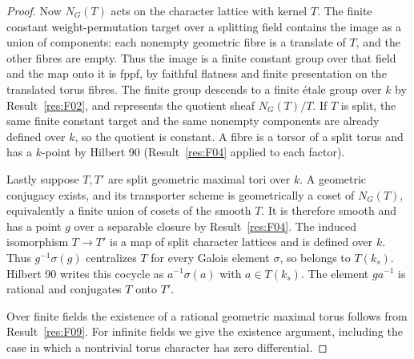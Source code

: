 \documentclass[11pt,a4paper,openany,oneside]{book}
\theoremstyle{resultstyle}
\theoremstyle{definition}
\numberwithin{equation}{chapter}
\begin{document}
\begin{proof}
Now \(N_G(T)\) acts on the character lattice with kernel \(T\).
The finite constant weight-permutation target over a
splitting field contains the image as a union of components:
each nonempty geometric fibre is a translate of \(T\),
and the other fibres are empty. Thus the image is a
finite constant group over that field and the map onto it
is fppf, by faithful flatness and finite presentation on the
translated torus fibres. The finite group descends to a finite
\'etale group over \(k\) by Result~\ref{res:F02}, and represents
the quotient sheaf \(N_G(T)/T\). If \(T\) is split, the same
finite constant target and the same nonempty components
are already defined over \(k\), so the quotient is constant.
A fibre is a torsor of a split torus and has a \(k\)-point by
Hilbert 90 (Result~\ref{res:F04} applied to each factor).

Lastly suppose \(T,T'\) are split geometric maximal tori
over \(k\). A geometric conjugacy exists, and its
transporter scheme is geometrically a coset of \(N_G(T)\),
equivalently a finite union of cosets of the smooth \(T\).
It is therefore smooth and has a point \(g\) over a separable
closure by Result~\ref{res:F04}. The induced isomorphism
\(T\to T'\) is a map of split character lattices and is defined
over \(k\). Thus \(g^{-1}\sigma(g)\) centralizes \(T\)
for every Galois element \(\sigma\), so belongs to \(T(k_s)\).
Hilbert 90 writes this cocycle as \(a^{-1}\sigma(a)\)
with \(a\in T(k_s)\). The element \(ga^{-1}\) is rational
and conjugates \(T\) onto \(T'\).

Over finite fields the existence of a rational geometric
maximal torus follows from Result~\ref{res:F09}. For infinite
fields we give the existence argument, including the case in
which a nontrivial torus character has zero differential.


\end{proof}
\end{document}
